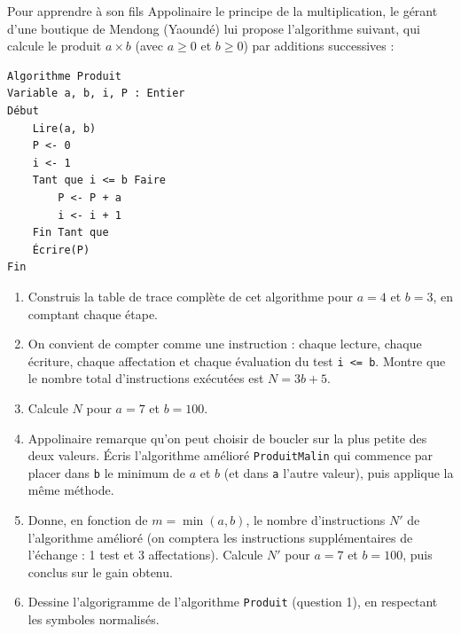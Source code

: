 \documentclass[11pt]{article}
\begin{document}
\begin{exercice}
Pour apprendre à son fils Appolinaire le principe de la multiplication, le gérant d'une boutique de Mendong (Yaoundé) lui propose l'algorithme suivant, qui calcule le produit $a \times b$ (avec $a \geq 0$ et $b \geq 0$) par additions successives :
\begin{lstlisting}
Algorithme Produit
Variable a, b, i, P : Entier
Début
    Lire(a, b)
    P <- 0
    i <- 1
    Tant que i <= b Faire
        P <- P + a
        i <- i + 1
    Fin Tant que
    Écrire(P)
Fin
\end{lstlisting}
\begin{enumerate}
\item Construis la table de trace complète de cet algorithme pour $a = 4$ et $b = 3$, en comptant chaque étape.
\item On convient de compter comme une instruction : chaque lecture, chaque écriture, chaque affectation et chaque évaluation du test \texttt{i <= b}. Montre que le nombre total d'instructions exécutées est $N = 3b + 5$.
\item Calcule $N$ pour $a = 7$ et $b = 100$.
\item Appolinaire remarque qu'on peut choisir de boucler sur la plus petite des deux valeurs. Écris l'algorithme amélioré \texttt{ProduitMalin} qui commence par placer dans \texttt{b} le minimum de $a$ et $b$ (et dans \texttt{a} l'autre valeur), puis applique la même méthode.
\item Donne, en fonction de $m = \min(a, b)$, le nombre d'instructions $N'$ de l'algorithme amélioré (on comptera les instructions supplémentaires de l'échange : 1 test et 3 affectations). Calcule $N'$ pour $a = 7$ et $b = 100$, puis conclus sur le gain obtenu.
\item Dessine l'algorigramme de l'algorithme \texttt{Produit} (question 1), en respectant les symboles normalisés.
\end{enumerate}
\end{exercice}
\end{document}
